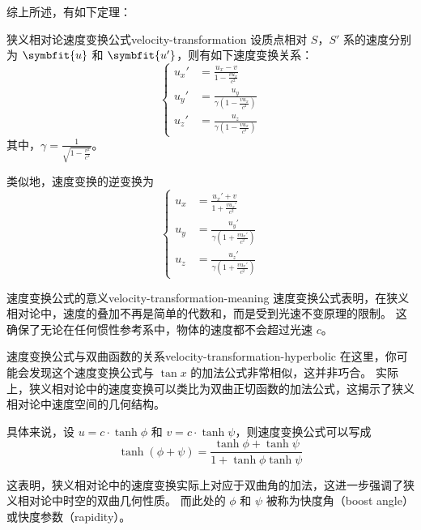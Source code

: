 综上所述，有如下定理：
\begin{theorem}{狭义相对论速度变换公式}{velocity-transformation}
    设质点相对 $S$，$S'$ 系的速度分别为 $\symbfit{u}$ 和 $\symbfit{u'}$，则有如下速度变换关系：
    \begin{equation}
        \left\{
        \begin{aligned}
            u_x' & = \frac{u_x - v}{1 - \frac{v u_x}{c^2}}                 \\
            u_y' & = \frac{u_y}{\gamma \left(1 - \frac{v u_x}{c^2}\right)} \\
            u_z' & = \frac{u_z}{\gamma \left(1 - \frac{v u_x}{c^2}\right)}
        \end{aligned}
        \right.
    \end{equation}
    其中，$\gamma = \frac{1}{\sqrt{1 - \frac{v^2}{c^2}}}$。
\end{theorem}

类似地，速度变换的逆变换为
\begin{equation}
    \left\{
    \begin{aligned}
        u_x & = \frac{u_x' + v}{1 + \frac{v u_x'}{c^2}}                 \\
        u_y & = \frac{u_y'}{\gamma \left(1 + \frac{v u_x'}{c^2}\right)} \\
        u_z & = \frac{u_z'}{\gamma \left(1 + \frac{v u_x'}{c^2}\right)}
    \end{aligned}
    \right.
\end{equation}

\begin{note}{速度变换公式的意义}{velocity-transformation-meaning}
    速度变换公式表明，在狭义相对论中，速度的叠加不再是简单的代数和，而是受到光速不变原理的限制。
    这确保了无论在任何惯性参考系中，物体的速度都不会超过光速 $c$。
\end{note}

\begin{note}{速度变换公式与双曲函数的关系}{velocity-transformation-hyperbolic}
    在这里，你可能会发现这个速度变换公式与 $\tan x$ 的加法公式非常相似，这并非巧合。
    实际上，狭义相对论中的速度变换可以类比为双曲正切函数的加法公式，这揭示了狭义相对论中速度空间的几何结构。

    具体来说，设 $u = c \cdot \tanh \phi$ 和 $v = c \cdot \tanh \psi$，则速度变换公式可以写成
    \begin{equation}
        \tanh(\phi + \psi) = \frac{\tanh \phi + \tanh \psi}{1 + \tanh \phi \tanh \psi}
    \end{equation}

    这表明，狭义相对论中的速度变换实际上对应于双曲角的加法，这进一步强调了狭义相对论中时空的双曲几何性质。
    而此处的 $\phi$ 和 $\psi$ 被称为快度角（boost angle）或快度参数（rapidity）。
\end{note}

